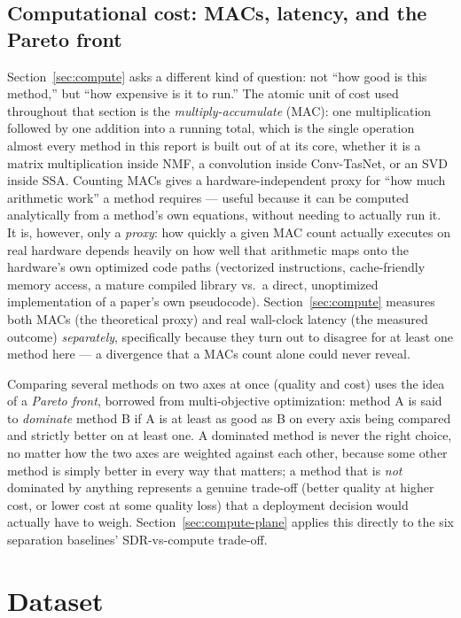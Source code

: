 \documentclass[11pt]{article}
\begin{document}
\subsection{Computational cost: MACs, latency, and the Pareto front}
\label{sec:bg-compute}

Section~\ref{sec:compute} asks a different kind of question: not ``how
good is this method,'' but ``how expensive is it to run.'' The atomic unit
of cost used throughout that section is the \emph{multiply-accumulate}
(MAC): one multiplication followed by one addition into a running total,
which is the single operation almost every method in this report is built
out of at its core, whether it is a matrix multiplication inside NMF, a
convolution inside Conv-TasNet, or an SVD inside SSA. Counting MACs gives a
hardware-independent proxy for ``how much arithmetic work'' a method
requires --- useful because it can be computed analytically from a
method's own equations, without needing to actually run it. It is,
however, only a \emph{proxy}: how quickly a given MAC count actually
executes on real hardware depends heavily on how well that arithmetic maps
onto the hardware's own optimized code paths (vectorized instructions,
cache-friendly memory access, a mature compiled library vs.\ a direct,
unoptimized implementation of a paper's own pseudocode). Section~\ref{sec:compute}
measures both MACs (the theoretical proxy) and real wall-clock latency
(the measured outcome) \emph{separately}, specifically because they turn
out to disagree for at least one method here --- a divergence that a MACs
count alone could never reveal.

Comparing several methods on two axes at once (quality and cost) uses the
idea of a \emph{Pareto front}, borrowed from multi-objective optimization:
method A is said to \emph{dominate} method B if A is at least as good as B
on every axis being compared and strictly better on at least one. A
dominated method is never the right choice, no matter how the two axes are
weighted against each other, because some other method is simply better in
every way that matters; a method that is \emph{not} dominated by anything
represents a genuine trade-off (better quality at higher cost, or lower
cost at some quality loss) that a deployment decision would actually have
to weigh. Section~\ref{sec:compute-plane} applies this directly to the six
separation baselines' SDR-vs-compute trade-off.

\section{Dataset}
\label{sec:dataset}
\end{document}
